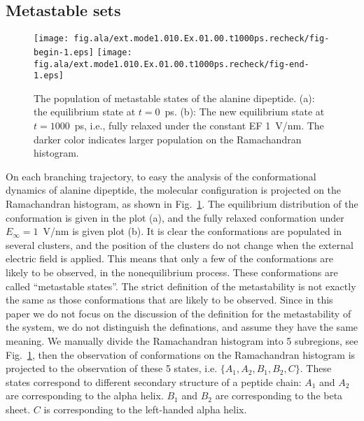 \documentclass[a4paper,preprint,unsortedaddress,onecolumn]{revtex4-1}
\begin{document}

\subsection{Metastable sets}

\begin{figure}
  \centering
  \texttt{[image: fig.ala/ext.mode1.010.Ex.01.00.t1000ps.recheck/fig-begin-1.eps]}
  \texttt{[image: fig.ala/ext.mode1.010.Ex.01.00.t1000ps.recheck/fig-end-1.eps]}
  \caption{The population of metastable states of the alanine dipeptide.
    (a): the
    equilibrium state at $t=0$~\textsf{ps}. (b): The new equilibrium
    state at $t=1000$~\textsf{ps}, i.e., fully relaxed under the
    constant EF 1~V/nm. The darker color
    indicates larger population on the Ramachandran histogram.}
  \label{fig:tmp4}
\end{figure}


On each branching trajectory, to easy the analysis of the conformational dynamics
of alanine dipeptide, the molecular configuration is projected on
the Ramachandran histogram, as
shown in Fig.~\ref{fig:tmp4}. The equilibrium distribution of the
conformation is given in the plot (a), and the fully relaxed
conformation under $E_{\infty} = 1$~V/nm is given  plot (b).  It is
clear the conformations are populated in several clusters, and the
position of the clusters do not change when the external electric
field is applied.
This means that only a few of the conformations are likely to be observed,
in the nonequilibrium process.
These conformations are called ``metastable states''.
The strict definition of the
metastability is not exactly the same as those conformations that are likely to be observed.
Since in this paper we do not focus on the discussion of the definition for the metastability of the system,
we do not distinguish the definations, and assume they have the same meaning.
We manually divide the
Ramachandran histogram into 5 subregions, see Fig.~\ref{fig:tmp4},
then the observation of conformations on the Ramachandran histogram is projected to the
observation of these 5 states, i.e. $\{A_1, A_2, B_1, B_2, C\}$.
These states
correspond to different secondary structure of a peptide chain:
$A_1$ and $A_2$ are
corresponding to the alpha helix. $B_1$ and $B_2$ are
corresponding to the beta sheet. $C$ is corresponding to the
left-handed alpha helix.
\end{document}
